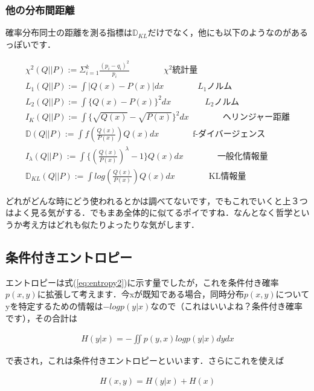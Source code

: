 \documentclass[11pt,a4paper]{jsarticle}                    %
\begin{document}
\subsubsection{他の分布間距離}
確率分布同士の距離を測る指標は$\mathbb{D}_{KL}$だけでなく，他にも以下のようなのがあるっぽいです\cite{dist}．
\begin{screen}
\begin{eqnarray}
\chi^2(Q||P) := \Sigma_{i=1}^k \frac{(p_i - q_i)^2}{p_i} \qquad \qquad  \text{$\chi^2$統計量}\\
L_1(Q||P) := \int |Q(x) - P(x)|dx   \qquad \qquad  \text{$L_1$ノルム} \\
L_2(Q||P) := \int\{ Q(x) - P(x)\}^2 dx   \qquad \qquad  \text{$L_2$ノルム}\\
I_K(Q||P) := \int \{ \sqrt{Q(x)} - \sqrt{P(x)} \}^2 dx    \qquad \qquad  \text{ヘリンジャー距離}\\
\mathbb{D}(Q||P) := \int f(\frac{Q(x)}{P(x)}) Q(x)dx   \qquad \qquad  \text{f-ダイバージェンス}\\
I_\lambda(Q||P) := \int \{ (\frac{Q(x)}{P(x)})^{\lambda} -1 \}Q(x) dx   \qquad \qquad  \text{一般化情報量}\\
\mathbb{D}_{KL}(Q||P) := \int log(\frac{Q(x)}{P(x)})Q(x) dx   \qquad \qquad  \text{KL情報量}
\end{eqnarray}
\end{screen}
どれがどんな時にどう使われるとかは調べてないです，でもこれでいくと上３つはよく見る気がする．でもまあ全体的に似てるポイですね．なんとなく哲学というか考え方はどれも似たりよったりな気がします．


\subsection{条件付きエントロピー}
エントロピーは式(\ref{eq:entropy2})に示す量でしたが，これを条件付き確率$p(x,y)$に拡張して考えます．今xが既知である場合，同時分布$p(x,y)$についてyを特定するための情報は$-log p(y|x)$なので（これはいいよね？条件付き確率です），その合計は

\begin{eqnarray}
\label{eq:cond_entropy}
H(y|x) = - \iint p(y,x) log p(y|x) dy dx
\end{eqnarray}

で表され，これは条件付きエントロピーといいます\cite{prml}\cite{dist}．さらにこれを使えば

\begin{eqnarray}
\label{eq:cond_entropy}
H(x,y) = H(y|x) + H(x)
\end{eqnarray}
\end{document}
